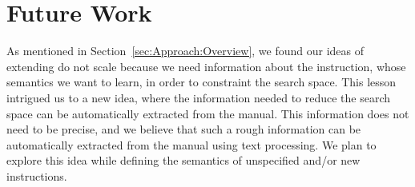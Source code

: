 \section{Future Work}
\label{sec:Future}

As mentioned in Section~\ref{sec:Approach:Overview}, we found our ideas of extending \Strata do not scale because we need information about the instruction, whose semantics we want to learn, in order to constraint the search space. This lesson intrigued us to a new idea, where the information needed to reduce the search space can be automatically extracted from the manual. This
 information does not need to be precise, and we believe that such a
rough information can be automatically extracted from the manual using text processing.  We plan to explore this idea while defining the semantics of
 unspecified and/or new instructions.
